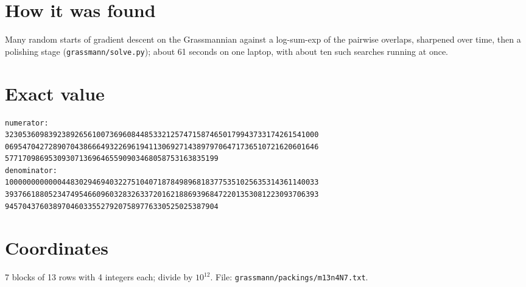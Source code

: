 \documentclass[11pt,a4paper]{article}
\begin{document}
\section{How it was found}
Many random starts of gradient descent on the Grassmannian against a log-sum-exp of the pairwise overlaps, sharpened over time, then a polishing stage (\texttt{grassmann/solve.py}); about 61 seconds on one laptop, with about ten such searches running at once.


\appendix
\section{Exact value}
{\small
\begin{verbatim}
numerator:
323053609839238926561007369608448533212574715874650179943733174261541000
069547042728907043866649322696194113069271438979706471736510721620601646
5771709869530930713696465590903468058753163835199
denominator:
100000000000044830294694032275104071878498968183775351025635314361140033
393766188052347495466096032832633720162188693968472201353081223093706393
9457043760389704603355279207589776330525025387904
\end{verbatim}}

\section{Coordinates}
7 blocks of 13 rows with 4 integers each; divide by $10^{12}$. File: \texttt{grassmann/packings/m13n4N7.txt}.
{\tiny
\begin{multicols}{3}
\end{multicols}}
\end{document}

